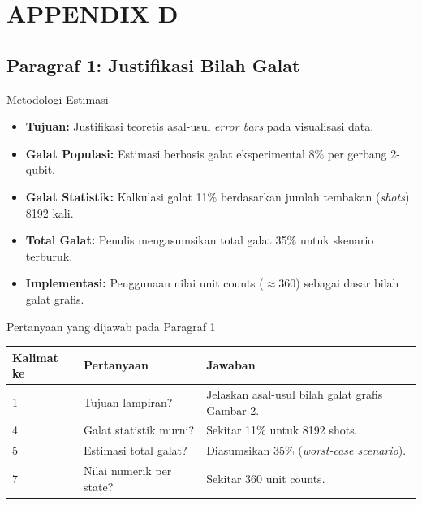 \section{APPENDIX D}

\subsection{Paragraf 1: Justifikasi Bilah Galat}
\begin{frame}{Metodologi Estimasi}
    \begin{itemize}
        \item \textbf{Tujuan:} Justifikasi teoretis asal-usul \textit{error bars} pada visualisasi data.
        \item \textbf{Galat Populasi:} Estimasi berbasis galat eksperimental 8\% per gerbang 2-qubit.
        \item \textbf{Galat Statistik:} Kalkulasi galat 11\% berdasarkan jumlah tembakan (\textit{shots}) 8192 kali.
        \item \textbf{Total Galat:} Penulis mengasumsikan total galat 35\% untuk skenario terburuk.
        \item \textbf{Implementasi:} Penggunaan nilai unit counts ($\approx 360$) sebagai dasar bilah galat grafis.
    \end{itemize}
\end{frame}

\begin{frame}{Pertanyaan yang dijawab pada Paragraf 1}
    \centering
    \small
    \begin{tabular}{lp{4.5cm}p{6cm}}
        \toprule
        Kalimat ke & Pertanyaan & Jawaban \\
        \midrule
        1 & Tujuan lampiran? & Jelaskan asal-usul bilah galat grafis Gambar 2. \\
        4 & Galat statistik murni? & Sekitar 11\% untuk 8192 shots. \\
        5 & Estimasi total galat? & Diasumsikan 35\% (\textit{worst-case scenario}). \\
        7 & Nilai numerik per state? & Sekitar 360 unit counts. \\
        \bottomrule
    \end{tabular}
\end{frame}
